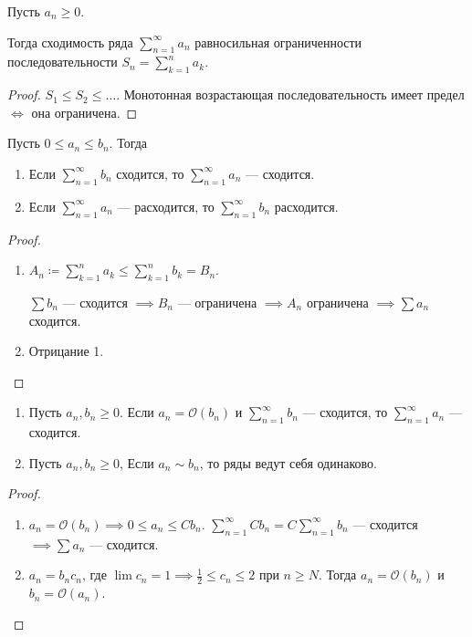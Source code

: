 \begin{theorem}
    Пусть $a_n \ge 0$.

    Тогда сходимость ряда $\sum\limits_{n=1}^\infty a_n$ равносильная ограниченности последовательности  $S_n = \sum\limits_{k=1}^n a_k$.
\end{theorem}
\begin{proof}
    $S_1 \le S_2 \le \ldots$. Монотонная возрастающая последовательность имеет предел $\iff$ она ограничена.
\end{proof}
\begin{theorem}
    Пусть $0 \le a_n \le b_n$. Тогда 
    \begin{enumerate}
        \item Если $\sum\limits_{n=1}^\infty b_n$ сходится, то  $\sum\limits_{n=1}^\infty a_n$ --- сходится.
        \item  Если $\sum\limits_{n=1}^\infty a_n$ --- расходится, то $\sum\limits_{n=1}^\infty b_n$ расходится.
    \end{enumerate}
\end{theorem}
\begin{proof}
    \begin{enumerate}
        \item $A_n \coloneqq \sum\limits_{k=1}^n a_k \le \sum\limits_{k=1}^n b_k = B_n$.

            $\sum b_n$ --- сходится  $\implies B_n$ --- ограничена  $\implies A_n$ ограничена  $\implies \sum a_n$ сходится.
        \item Отрицание 1.
    \end{enumerate}
\end{proof}
\begin{consequence}
    \begin{enumerate}    
        \item Пусть $a_n, b_n \ge 0$. Если $a_n = \mathcal{O}(b_n)$ и  $\sum\limits_{n=1}^\infty b_n$ --- сходится, то  $\sum\limits_{n=1}^\infty a_n$ --- сходится.
        \item Пусть $a_n, b_n \ge 0$, Если $a_n \sim b_n$, то ряды ведут себя одинаково.
    \end{enumerate}
\end{consequence}
\begin{proof}
    \begin{enumerate}
        \item $a_n = \mathcal{O}(b_n) \implies 0 \le a_n \le Cb_n$. $\sum\limits_{n=1}^\infty Cb_n = C \sum\limits_{n=1}^\infty b_n$ --- сходится  $\implies \sum a_n$ --- сходится.
        \item $a_n = b_nc_n$, где  $\lim c_n = 1 \implies \frac{1}{2} \le c_n \le 2$ при $n\ge N$. Тогда $a_n = \mathcal{O}(b_n)$ и  $b_n = \mathcal{O}(a_n)$.
    \end{enumerate}
\end{proof}
